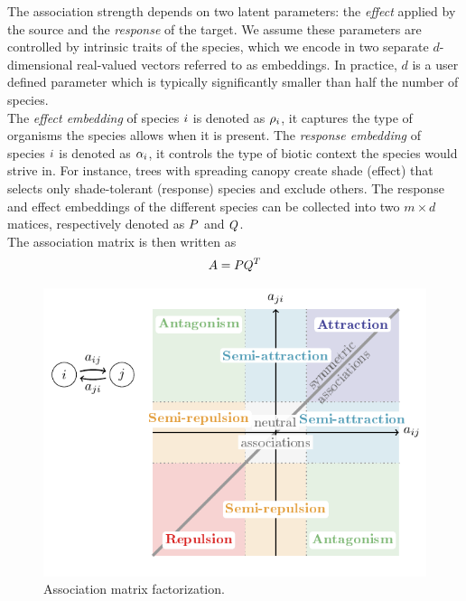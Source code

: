 \documentclass[10pt,a4paper]{article}
\begin{document}
The association strength depends on two latent parameters: the \textit{effect} applied by the source and the \textit{response} of the target. We assume these parameters are controlled by intrinsic traits of the species, which we encode in two separate $d$-dimensional real-valued vectors referred to as embeddings.
In practice, $d$ is a user defined parameter which is typically significantly smaller than half the number of species. \\

The \emph{effect embedding} of species $i$ is denoted as $\rho_i$, it captures the type of organisms the species allows when it is present. The \emph{response embedding} of species $i$ is denoted as $\alpha_i$, it controls the type of biotic context the species would strive in. For instance, trees with spreading canopy create shade (effect) that selects only shade-tolerant (response) species and exclude others. The response and effect embeddings of the different species can be collected into two $m\times d$ matices, respectively denoted as $P$ and $Q$. \\

The association matrix is then written as
\begin{equation*}
	A = PQ^{T}
\end{equation*}

\begin{figure}[bthp]
  \centering
  \includegraphics[page=2]{tikz_figures.pdf}
  \caption{Association matrix factorization.}
  \label{factoriz}
\end{figure}
\end{document}

